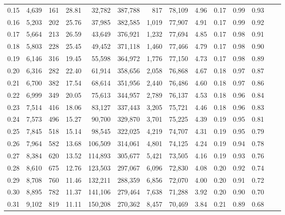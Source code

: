 \begin{tabular}{rrrrrrrrrrrrrr}
0.15 &  4,639 &    161 &   28.81 &   32,782 &  387,788 &     817 &  78,109 &  4.96 &  0.17 &  0.99 &      0.93 \\
0.16 &  5,203 &    202 &   25.76 &   37,985 &  382,585 &   1,019 &  77,907 &  4.91 &  0.17 &  0.99 &      0.92 \\
0.17 &  5,664 &    213 &   26.59 &   43,649 &  376,921 &   1,232 &  77,694 &  4.85 &  0.17 &  0.98 &      0.91 \\
0.18 &  5,803 &    228 &   25.45 &   49,452 &  371,118 &   1,460 &  77,466 &  4.79 &  0.17 &  0.98 &      0.90 \\
0.19 &  6,146 &    316 &   19.45 &   55,598 &  364,972 &   1,776 &  77,150 &  4.73 &  0.17 &  0.98 &      0.89 \\
0.20 &  6,316 &    282 &   22.40 &   61,914 &  358,656 &   2,058 &  76,868 &  4.67 &  0.18 &  0.97 &      0.87 \\
0.21 &  6,700 &    382 &   17.54 &   68,614 &  351,956 &   2,440 &  76,486 &  4.60 &  0.18 &  0.97 &      0.86 \\
0.22 &  6,999 &    349 &   20.05 &   75,613 &  344,957 &   2,789 &  76,137 &  4.53 &  0.18 &  0.96 &      0.84 \\
0.23 &  7,514 &    416 &   18.06 &   83,127 &  337,443 &   3,205 &  75,721 &  4.46 &  0.18 &  0.96 &      0.83 \\
0.24 &  7,573 &    496 &   15.27 &   90,700 &  329,870 &   3,701 &  75,225 &  4.39 &  0.19 &  0.95 &      0.81 \\
0.25 &  7,845 &    518 &   15.14 &   98,545 &  322,025 &   4,219 &  74,707 &  4.31 &  0.19 &  0.95 &      0.79 \\
0.26 &  7,964 &    582 &   13.68 &  106,509 &  314,061 &   4,801 &  74,125 &  4.24 &  0.19 &  0.94 &      0.78 \\
0.27 &  8,384 &    620 &   13.52 &  114,893 &  305,677 &   5,421 &  73,505 &  4.16 &  0.19 &  0.93 &      0.76 \\
0.28 &  8,610 &    675 &   12.76 &  123,503 &  297,067 &   6,096 &  72,830 &  4.08 &  0.20 &  0.92 &      0.74 \\
0.29 &  8,708 &    760 &   11.46 &  132,211 &  288,359 &   6,856 &  72,070 &  4.00 &  0.20 &  0.91 &      0.72 \\
0.30 &  8,895 &    782 &   11.37 &  141,106 &  279,464 &   7,638 &  71,288 &  3.92 &  0.20 &  0.90 &      0.70 \\
0.31 &  9,102 &    819 &   11.11 &  150,208 &  270,362 &   8,457 &  70,469 &  3.84 &  0.21 &  0.89 &      0.68 \\

\end{tabular}
